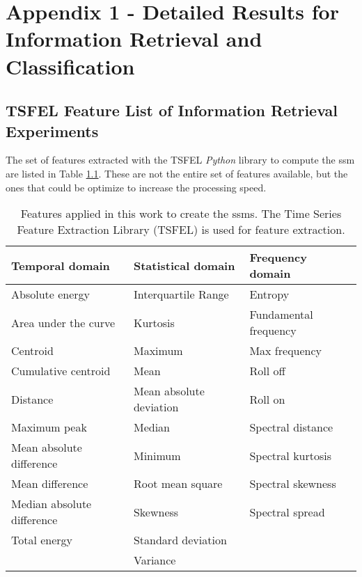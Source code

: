 
%

\chapter{Appendix 1 - Detailed Results for Information Retrieval and Classification}
\label{appendix:tables_detailed}

\section{TSFEL Feature List of Information Retrieval Experiments}
\label{app:tsfel}

The set of features extracted with the TSFEL \textit{Python} library to compute the \gls{ssm} are listed in Table \ref{tab:tsfel_featurelist}. These are not the entire set of features available, but the ones that could be optimize to increase the processing speed.  

\begin{table}
    \centering
    \caption{Features applied in this work to create the \gls{ssm}s. The Time Series Feature Extraction Library (TSFEL) is used for feature extraction.}
    \begin{tabular}{l|l|l}
    \toprule
        \textbf{Temporal domain} &  \textbf{Statistical domain} & \textbf{Frequency domain}\\
    \midrule
        Absolute energy & Interquartile Range & Entropy\\
        Area under the curve & Kurtosis & Fundamental frequency\\
        Centroid & Maximum & Max frequency\\
        Cumulative centroid & Mean & Roll off\\
        Distance & Mean absolute deviation & Roll on \\
        Maximum peak & Median & Spectral distance\\
        Mean absolute difference & Minimum & Spectral kurtosis\\
        Mean difference & Root mean square & Spectral skewness\\
        Median absolute difference & Skewness & Spectral spread\\
        Total energy & Standard deviation & \\
         & Variance & \\
    \bottomrule
    \end{tabular}
    \label{tab:tsfel_featurelist}
\end{table}

